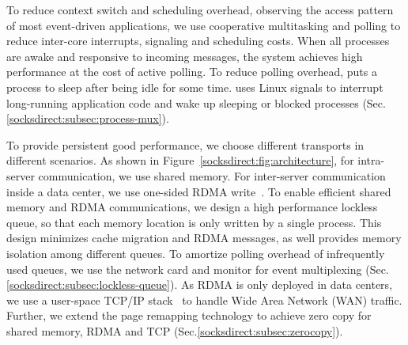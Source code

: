 To reduce context switch and scheduling overhead, observing the access pattern of most event-driven applications, we use cooperative multitasking and polling to reduce inter-core interrupts, signaling and scheduling costs. When all processes are awake and responsive to incoming messages, the system achieves high performance at the cost of active polling. To reduce polling overhead, \sys puts a process to sleep after being idle for some time. \sys uses Linux signals to interrupt long-running application code and wake up sleeping or blocked processes (Sec.\ref{socksdirect:subsec:process-mux}). 

 To provide persistent good performance, we choose different transports in different scenarios. As shown in Figure~\ref{socksdirect:fig:architecture}, for intra-server communication, we use shared memory. For inter-server communication inside a data center, we use one-sided RDMA write~\cite{mitchell2013using,kaminsky2016design}. To enable efficient shared memory and RDMA communications, we design a high performance lockless queue, so that each memory location is only written by a single process. This design minimizes cache migration and RDMA messages, as well provides memory isolation among different queues. To amortize polling overhead of infrequently used queues, we use the network card and monitor for event multiplexing (Sec.\ref{socksdirect:subsec:lockless-queue}). As RDMA is only deployed in data centers, we use a user-space TCP/IP stack~\cite{dunkels2001design} to handle Wide Area Network (WAN) traffic. Further, we extend the page remapping technology to achieve zero copy for shared memory, RDMA and TCP (Sec.\ref{socksdirect:subsec:zerocopy}).

